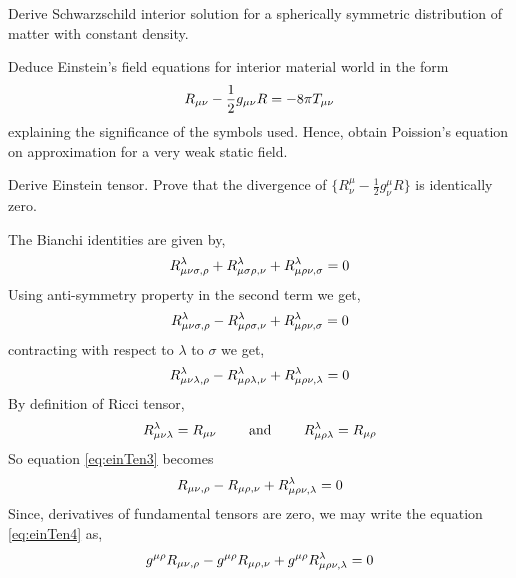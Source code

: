 \documentclass[../main-sheet.tex]{subfiles}
\begin{document}
    \begin{prob}
        Derive Schwarzschild interior solution for a spherically symmetric distribution of matter with constant density.
    \end{prob}
    \begin{prob}
        Deduce Einstein's field equations for interior material world in the form
        \[R_{\mu\nu}-\frac{1}{2}g_{\mu\nu} R=-8\pi T_{\mu\nu}\]
        explaining the significance of the symbols used. Hence, obtain Poission's equation on approximation for a very weak static field.
    \end{prob}
    \begin{prob}
        Derive Einstein tensor. Prove that the divergence of \(\{R_\nu^\mu-\frac{1}{2}g_\nu^\mu R\}\) is identically zero.
    \end{prob}
    \begin{soln}
        The Bianchi identities are given by,
        \begin{equation}
            R_{{\mu\nu} \sigma,\rho}^\lambda+R_{\mu \sigma \rho,\nu}^\lambda+R_{\mu \rho \nu,\sigma}^\lambda=0
            \label{eq:einTen1}
        \end{equation}
        Using anti-symmetry property in the second term we get,
        \begin{equation}
            R_{{\mu\nu} \sigma,\rho}^\lambda - R_{\mu \rho \sigma ,\nu}^\lambda+R_{\mu \rho \nu,\sigma}^\lambda=0
            \label{eq:einTen2}
        \end{equation}
        contracting with respect to \(\lambda\) to \(\sigma\) we get,
        \begin{equation}
            R_{{\mu\nu} \lambda,\rho}^\lambda - R_{\mu \rho \lambda ,\nu}^\lambda+R_{\mu \rho \nu,\lambda}^\lambda=0
            \label{eq:einTen3}
        \end{equation}
        By definition of Ricci tensor,
        \[
            R_{{\mu\nu}\lambda}^\lambda=R_{\mu\nu}\qquad\text{ and }\qquad R_{\mu\rho\lambda}^\lambda=R_{\mu\rho}
            \]
            So equation \eqref{eq:einTen3} becomes
            \begin{equation}
                R_{{\mu\nu},\rho} - R_{\mu \rho ,\nu}+R_{\mu \rho \nu,\lambda}^\lambda=0
                \label{eq:einTen4}
            \end{equation}
            Since, derivatives of fundamental tensors are zero, we may write the equation \eqref{eq:einTen4} as,
            \begin{align*}
                &g^{\mu \rho} R_{\mn,\rho} - g^{\mu \rho}R_{\mu \rho ,\nu}+g^{\mu \rho}R_{\mu \rho \nu,\lambda}^\lambda=0\\

\end{align*}
\end{soln}
\end{document}
